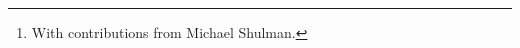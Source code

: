 \documentclass[oneside,a4paper]{article}
\title{#1}
\begin{document}
\author{Jonathan Sterling\thanks{With contributions from Michael Shulman.}}



\printbibliography
\end{document}
